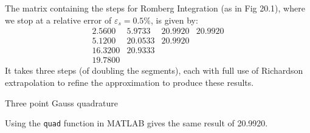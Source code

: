 \documentclass{article}
\begin{document}
\begin{solution}
The matrix containing the steps for Romberg Integration (as in Fig 20.1), where we stop at a relative error of $\varepsilon_{s}=0.5\%$, is given by:
\[
\begin{matrix}
2.5600	&	5.9733	&	20.9920	&	20.9920	\\
5.1200	&	20.0533	&	20.9920	&			\\
16.3200	&	20.9333	&			&			\\
19.7800	&			&			&			
\end{matrix}
\]
It takes three steps (of doubling the segments), each with full use of Richardson extrapolation to refine the approximation to produce these results.
\end{solution}

\begin{solution}
Three point Gauss quadrature
\end{solution}

\begin{solution}
Using the \verb|quad| function in MATLAB gives the same result of 20.9920.
\end{solution}
\end{document}
